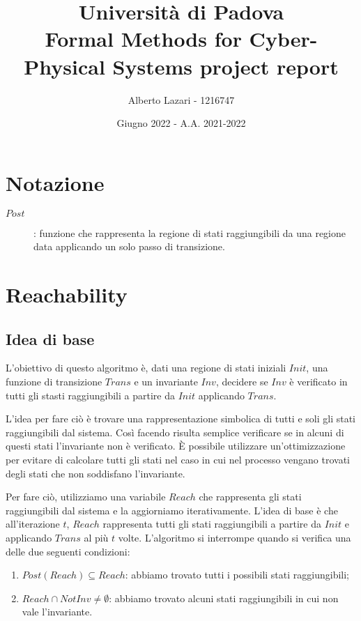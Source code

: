 \documentclass[12pt]{article}
\title{\textbf{Università di Padova \\ Formal Methods for Cyber-Physical Systems project report}}
\author{Alberto Lazari - 1216747\\}
\date{Giugno 2022 - A.A. 2021-2022}
\begin{document}
    \maketitle
    \pagebreak

    \tableofcontents
    \pagebreak

    \section{Notazione}
    \begin{description}
        \item[$Post$]: funzione che rappresenta la regione di stati raggiungibili da una regione data applicando un solo passo di transizione.
    \end{description}

    \section{Reachability}
    \subsection{Idea di base}
    L'obiettivo di questo algoritmo è, dati una regione di stati iniziali $Init$, una funzione di transizione $Trans$ e un invariante $Inv$, decidere se $Inv$ è verificato in tutti gli stasti raggiungibili a partire da $Init$ applicando $Trans$.

    L'idea per fare ciò è trovare una rappresentazione simbolica di tutti e soli gli stati raggiungibili dal sistema.
    Così facendo risulta semplice verificare se in alcuni di questi stati l'invariante non è verificato.
    È possibile utilizzare un'ottimizzazione per evitare di calcolare tutti gli stati nel caso in cui nel processo vengano trovati degli stati che non soddisfano l'invariante.

    Per fare ciò, utilizziamo una variabile $Reach$ che rappresenta gli stati raggiungibili dal sistema e la aggiorniamo iterativamente.
    L'idea di base è che all'iterazione $t$, $Reach$ rappresenta tutti gli stati raggiungibili a partire da $Init$ e applicando $Trans$ al più $t$ volte.
    L'algoritmo si interrompe quando si verifica una delle due seguenti condizioni:
    \begin{enumerate}
        \item $Post(Reach) \subseteq Reach $: abbiamo trovato tutti i possibili stati raggiungibili;
        \item $Reach \cap NotInv \neq \emptyset$: abbiamo trovato alcuni stati raggiungibili in cui non vale l'invariante.
    \end{enumerate}
\end{document}
